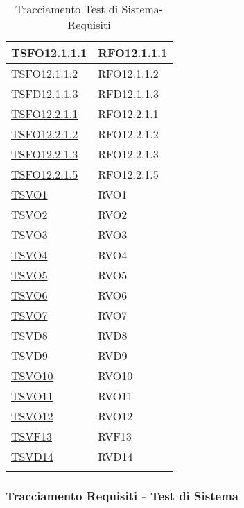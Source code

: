 \begin{longtable}{|>{\centering}m{5cm}|m{5cm}<{\centering}|}
	\hyperlink{TSFO12.1.1.1}{TSFO12.1.1.1} & RFO12.1.1.1\\ \hline
	\hyperlink{TSFO12.1.1.2}{TSFO12.1.1.2} & RFO12.1.1.2\\ \hline
	\hyperlink{TSFD12.1.1.3}{TSFD12.1.1.3} & RFD12.1.1.3\\ \hline
	\hyperlink{TSFO12.2.1.1}{TSFO12.2.1.1} & RFO12.2.1.1\\ \hline
	\hyperlink{TSFO12.2.1.2}{TSFO12.2.1.2} & RFO12.2.1.2\\ \hline
	\hyperlink{TSFO12.2.1.3}{TSFO12.2.1.3} & RFO12.2.1.3\\ \hline
	\hyperlink{TSFO12.2.1.5}{TSFO12.2.1.5} & RFO12.2.1.5\\ \hline
	\hyperlink{TSVO1}{TSVO1} & RVO1\\ \hline
	\hyperlink{TSVO2}{TSVO2} & RVO2\\ \hline
	\hyperlink{TSVO3}{TSVO3} & RVO3\\ \hline
	\hyperlink{TSVO4}{TSVO4} & RVO4\\ \hline
	\hyperlink{TSVO5}{TSVO5} & RVO5\\ \hline
	\hyperlink{TSVO6}{TSVO6} & RVO6\\ \hline
	\hyperlink{TSVO7}{TSVO7} & RVO7\\ \hline
	\hyperlink{TSVD8}{TSVD8} & RVD8\\ \hline
	\hyperlink{TSVD9}{TSVD9} & RVD9\\ \hline
	\hyperlink{TSVO10}{TSVO10} & RVO10\\ \hline
	\hyperlink{TSVO11}{TSVO11} & RVO11\\ \hline
	\hyperlink{TSVO12}{TSVO12} & RVO12\\ \hline
	\hyperlink{TSVF13}{TSVF13} & RVF13\\ \hline
	\hyperlink{TSVD14}{TSVD14} & RVD14\\ \hline	
	\caption[Tracciamento Test di Sistema-Requisiti]{Tracciamento Test di Sistema-Requisiti}
	\label{tabella:ts-requi}
\end{longtable}
\clearpage

\subsubsection{Tracciamento Requisiti - Test di Sistema}

